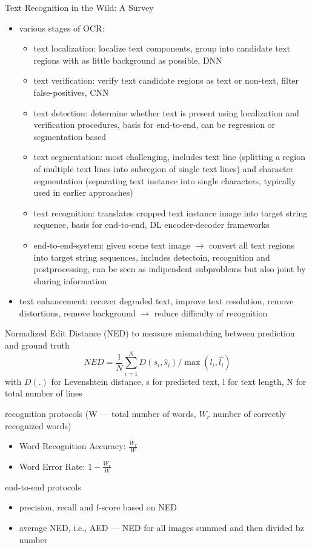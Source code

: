 Text Recognition in the Wild: A Survey~\citep{chen_text_2021}
\begin{itemize}
    \item various stages of \ac{OCR}:
        \begin{itemize}
            \item text localization: localize text components, group into candidate text regions with
                as little background as possible, DNN
            \item text verification: verify text candidate regions as text or non-text,
                filter false-positives, CNN
            \item text detection: determine whether text is present using localization and verification
                procedures, basis for end-to-end, can be regression or segmentation based
            \item text segmentation: most challenging, includes text line (splitting a region of multiple
                text lines into subregion of single text lines) and character segmentation (separating
                text instance into single characters, typically used in earlier approaches)
            \item text recognition: translates cropped text instance image into target string sequence,
                basis for end-to-end, DL encoder-decoder frameworks
            \item end-to-end-system: given scene text image $\rightarrow$ convert all text regions into
                target string sequences, includes detectoin, recognition and postprocessing, can be
                seen as indipendent subproblems but also joint by sharing information
        \end{itemize}
    \item text enhancement: recover degraded text, improve text resolution, remove distortions,
        remove background $\rightarrow$ reduce difficulty of recognition
\end{itemize}

Normalized Edit Distance (NED) to measure mismatching between prediction and ground truth
\[NED = \frac{1}{N}\sum_{i=1}^N D(s_i,\hat{s}_i)/\max(l_i,\hat{l_i})\]
with $D(.)$ for Levenshtein distance, s for predicted text, l for text length, N for total number of lines

recognition protocols (W --- total number of words, $W_r$ number of correctly recognized words)
\begin{itemize}
    \item Word Recognition Accuracy: $\frac{W_r}{W}$
    \item Word Error Rate: $1 - \frac{W_r}{W}$
\end{itemize}
end-to-end protocols
\begin{itemize}
    \item precision, recall and f-score based on NED
    \item average NED, i.e., AED --- NED for all images summed and then divided bz number
\end{itemize}


